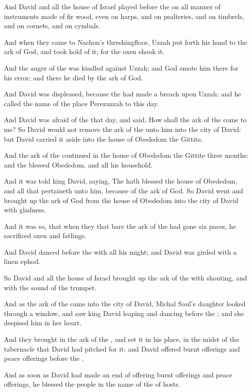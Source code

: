 \verse And David and all the house of Israel played before the \LORD on all manner of instruments made of fir wood, even on harps, and on psalteries, and on timbrels, and on cornets, and on cymbals.

\verse And when they came to Nachon's threshingfloor, Uzzah put forth his hand to the ark of God, and took hold of it; for the oxen shook it.

\verse And the anger of the \LORD was kindled against Uzzah; and God smote him there for his error; and there he died by the ark of God.

\verse And David was displeased, because the \LORD had made a breach upon Uzzah: and he called the name of the place Perezuzzah to this day.

\verse And David was afraid of the \LORD that day, and said, How shall the ark of the \LORD come to me?  \verse So David would not remove the ark of the \LORD unto him into the city of David: but David carried it aside into the house of Obededom the Gittite.

\verse And the ark of the \LORD continued in the house of Obededom the Gittite three months: and the \LORD blessed Obededom, and all his household.

\verse And it was told king David, saying, The \LORD hath blessed the house of Obededom, and all that pertaineth unto him, because of the ark of God. So David went and brought up the ark of God from the house of Obededom into the city of David with gladness.

\verse And it was so, that when they that bare the ark of the \LORD had gone six paces, he sacrificed oxen and fatlings.

\verse And David danced before the \LORD with all his might; and David was girded with a linen ephod.

\verse So David and all the house of Israel brought up the ark of the \LORD with shouting, and with the sound of the trumpet.

\verse And as the ark of the \LORD came into the city of David, Michal Saul's daughter looked through a window, and saw king David leaping and dancing before the \LORD; and she despised him in her heart.

\verse And they brought in the ark of the \LORD, and set it in his place, in the midst of the tabernacle that David had pitched for it: and David offered burnt offerings and peace offerings before the \LORD.

\verse And as soon as David had made an end of offering burnt offerings and peace offerings, he blessed the people in the name of the \LORD of hosts.

